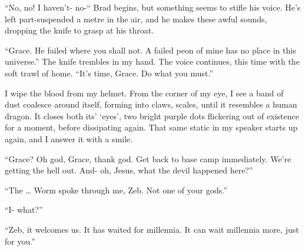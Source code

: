 “No, no! I haven’t- no-“ Brad begins, but something seems to stifle his voice. He’s left part-suspended a metre in the air, and he makes these awful sounds, dropping the knife to grasp at his throat.  

“Grace. He failed where you shall not. A failed peon of mine has no place in this universe.” The knife trembles in my hand. The voice continues, this time with the soft trawl of home. “It’s time, Grace. Do what you must.”  

I wipe the blood from my helmet. From the corner of my eye, I see a band of dust coalesce around itself, forming into claws, scales, until it resembles a human dragon. It closes both its’ ‘eyes’, two bright purple dots flickering out of existence for a moment, before dissipating again. That same static in my speaker starts up again, and I answer it with a smile.  

“Grace? Oh god, Grace, thank god. Get back to base camp immediately. We’re getting the hell out. And- oh, Jesus, what the devil happened here?”  

“The … Worm spoke through me, Zeb. Not one of your gods.”  

“I- what?”  

“Zeb, it welcomes us. It has waited for millennia. It can wait millennia more, just for you.”
